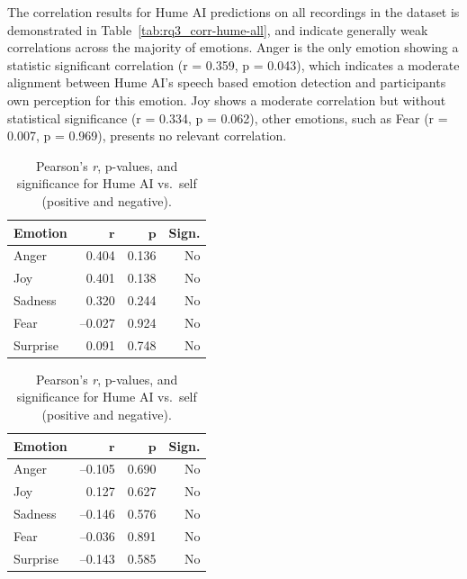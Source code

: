 The correlation results for Hume AI predictions on all recordings in the dataset is demonstrated in Table~\ref{tab:rq3_corr-hume-all}, and indicate generally weak correlations across the majority of emotions. 
Anger is the only emotion showing a statistic significant correlation (r = 0.359, p = 0.043), which indicates a moderate alignment between Hume AI's speech based emotion 
detection and participants own perception for this emotion. Joy shows a moderate correlation but without statistical significance (r = 0.334, p = 0.062), other emotions, such as Fear (r = 0.007, p = 0.969), presents no relevant correlation. 

\begin{table}[H]
    \centering
  
    \begin{subtable}{0.45\textwidth}
      \centering
      \caption{\textbf{Positive Recordings (Hume)}}
      \label{tab:rq3_corr-hume-pos}
      \begin{tabular}{l r r r}
        \toprule
        \textbf{Emotion} & \(\mathbf{r}\) & \(\mathbf{p}\) & \textbf{Sign.} \\
        \midrule
        Anger    &  0.404 & 0.136 & No  \\
        Joy      &  0.401 & 0.138 & No  \\
        Sadness  &  0.320 & 0.244 & No  \\
        Fear     & –0.027 & 0.924 & No  \\
        Surprise &  0.091 & 0.748 & No  \\
        \bottomrule
      \end{tabular}
    \end{subtable}\hfill
    \begin{subtable}{0.45\textwidth}
      \centering
      \caption{\textbf{Negative Recordings (Hume)}}\label{tab:rq3_corr-hume-neg}
      \begin{tabular}{l r r r}
        \toprule
        \textbf{Emotion} & \(\mathbf{r}\) & \(\mathbf{p}\) & \textbf{Sign.} \\
        \midrule
        Anger    & –0.105 & 0.690 & No  \\
        Joy      &  0.127 & 0.627 & No  \\
        Sadness  & –0.146 & 0.576 & No  \\
        Fear     & –0.036 & 0.891 & No  \\
        Surprise & –0.143 & 0.585 & No  \\
        \bottomrule
      \end{tabular}
    \end{subtable}
  
    \caption{Pearson’s \emph{r}, p-values, and significance for Hume AI vs.\ self (positive and negative).}
    \label{tab:rq3_corr-hume-pos-neg}
  \end{table}

